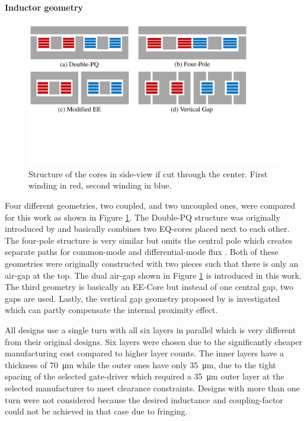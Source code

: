 \documentclass{IPEC2026}
\begin{document}
\paragraph{Inductor geometry}
\begin{figure}
  \includegraphics[page=1, trim = 0cm 7cm 4.5cm 0cm, clip, width=\columnwidth]{figures/IPEC_Figures_PowerPoint.pdf}
  \caption{Structure of the cores in side-view if cut through the center. First winding in red, second winding in blue.}
  \label{fig:Core_Drawings}
\end{figure}
Four different geometries, two coupled, and two uncoupled ones, were compared for this work as shown in Figure \ref{fig:Core_Drawings}. The Double-PQ structure was originally introduced by \cite{wangPCBWindingBasedCoupled2023} and basically combines two EQ-cores placed next to each other. The four-pole structure is very similar but omits the central pole which creates separate paths for common-mode and differential-mode flux \cite{huaUltrathinCoupledInductor2021}. Both of these geometries were originally constructed with two pieces such that there is only an air-gap at the top. The dual air-gap shown in Figure \ref{fig:Core_Drawings} is introduced in this work. The third geometry is basically an EE-Core but instead of one central gap, two gaps are used. Lastly, the vertical gap geometry proposed by \cite{schaferNovelHighlyEfficient2020} is investigated which can partly compensate the internal proximity effect. %
\par All designs use a single turn with all six layers in parallel which is very different from their original designs. Six layers were chosen due to the significantly cheaper manufacturing cost compared to higher layer counts. The inner layers have a thickness of \qty{70}{\um} while the outer ones have only \qty{35}{\um}, due to the tight spacing of the selected gate-driver which required a \qty{35}{\um} outer layer at the selected manufacturer to meet clearance constraints. Designs with more than one turn were not considered because the desired inductance and coupling-factor could not be achieved in that case due to fringing.
\end{document}
